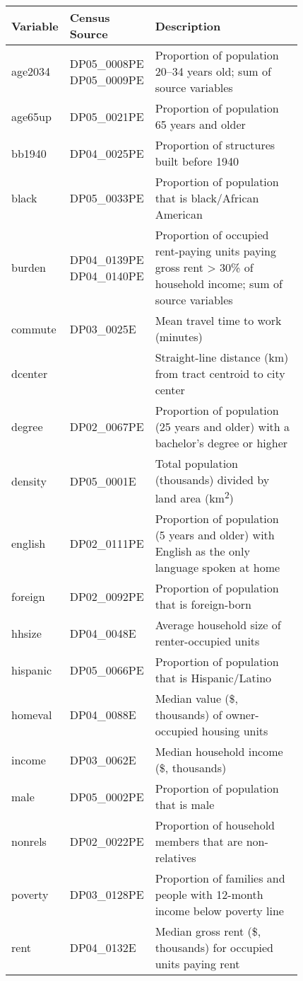 \begin{tabular}{l p{0.15\linewidth} p{0.675\linewidth}}
\toprule
Variable & Census Source & Description \\
\midrule
age2034  & DP05\_0008PE DP05\_0009PE & Proportion of population 20--34 years old; sum of source variables\\
age65up  & DP05\_0021PE & Proportion of population 65 years and older\\
bb1940   & DP04\_0025PE & Proportion of structures built before 1940\\
black    & DP05\_0033PE & Proportion of population that is black/African American\\
burden   & DP04\_0139PE DP04\_0140PE & Proportion of occupied rent-paying units paying gross rent > 30\% of household income; sum of source variables\\
commute  & DP03\_0025E  & Mean travel time to work (minutes)\\
dcenter  &              & Straight-line distance (km) from tract centroid to city center\\
degree   & DP02\_0067PE & Proportion of population (25 years and older) with a bachelor's degree or higher\\
density  & DP05\_0001E  & Total population (thousands) divided by land area (km\textsuperscript{2})\\
english  & DP02\_0111PE & Proportion of population (5 years and older) with English as the only language spoken at home\\
foreign  & DP02\_0092PE & Proportion of population that is foreign-born\\
hhsize   & DP04\_0048E  & Average household size of renter-occupied units\\
hispanic & DP05\_0066PE & Proportion of population that is Hispanic/Latino\\
homeval  & DP04\_0088E  & Median value (\$, thousands) of owner-occupied housing units\\
income   & DP03\_0062E  & Median household income (\$, thousands)\\
male     & DP05\_0002PE & Proportion of population that is male\\
nonrels  & DP02\_0022PE & Proportion of household members that are non-relatives\\
poverty  & DP03\_0128PE & Proportion of families and people with 12-month income below poverty line\\
rent     & DP04\_0132E  & Median gross rent (\$, thousands) for occupied units paying rent\\

\end{tabular}
